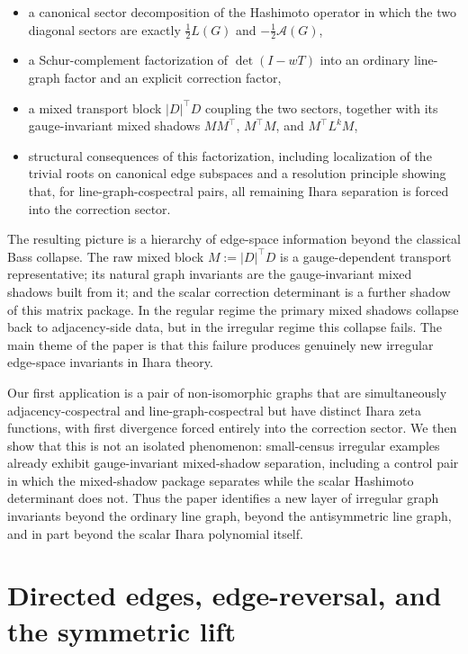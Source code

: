 \documentclass[11pt]{article}
\begin{document}
\begin{itemize}[leftmargin=2.2em]
\item a canonical sector decomposition of the Hashimoto operator in which the two diagonal sectors are exactly \(\frac12 L(G)\) and \(-\frac12\mathcal A(G)\),
\item a Schur-complement factorization of \(\det(I-wT)\) into an ordinary line-graph factor and an explicit correction factor,
\item a mixed transport block \(|D|^\top D\) coupling the two sectors, together with its gauge-invariant mixed shadows \(MM^\top\), \(M^\top M\), and \(M^\top L^kM\),
\item structural consequences of this factorization, including localization of the trivial roots on canonical edge subspaces and a resolution principle showing that, for line-graph-cospectral pairs, all remaining Ihara separation is forced into the correction sector.
\end{itemize}

The resulting picture is a hierarchy of edge-space information beyond the classical Bass collapse. The raw mixed block $M:=|D|^\top D$ is a gauge-dependent transport representative; its natural graph invariants are the gauge-invariant mixed shadows built from it; and the scalar correction determinant is a further shadow of this matrix package. In the regular regime the primary mixed shadows collapse back to adjacency-side data, but in the irregular regime this collapse fails. The main theme of the paper is that this failure produces genuinely new irregular edge-space invariants in Ihara theory.

Our first application is a pair of non-isomorphic graphs that are simultaneously adjacency-cospectral and line-graph-cospectral but have distinct Ihara zeta functions, with first divergence forced entirely into the correction sector. We then show that this is not an isolated phenomenon: small-census irregular examples already exhibit gauge-invariant mixed-shadow separation, including a control pair in which the mixed-shadow package separates while the scalar Hashimoto determinant does not. Thus the paper identifies a new layer of irregular graph invariants beyond the ordinary line graph, beyond the antisymmetric line graph, and in part beyond the scalar Ihara polynomial itself.

\section{Directed edges, edge-reversal, and the symmetric lift}
\end{document}
